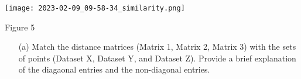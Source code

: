 \documentclass[11pt]{article}
\begin{document}
\begin{itemize}
\begin{center}
  \texttt{[image: 2023-02-09\_09-58-34\_similarity.png]}
\begin{center} Figure 5 \end{center}
\end{center}

\begin{enumerate}
  \item[(a)]	Match the distance matrices (Matrix 1, Matrix 2, Matrix 3) with the sets of points (Dataset X, Dataset Y, and Dataset Z). Provide a brief explanation of the diagaonal entries and the non-diagonal entries. 
%

\end{enumerate}
\end{itemize}
\end{document}
